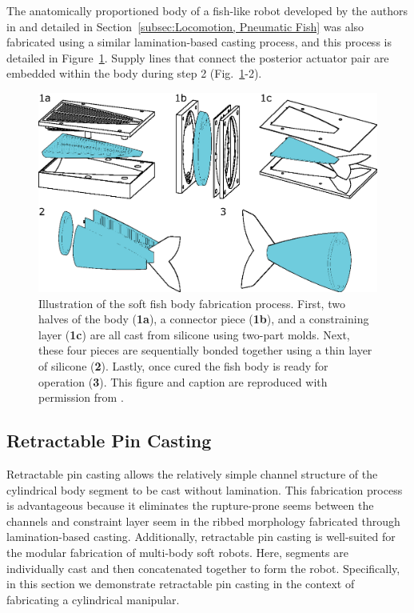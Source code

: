 The anatomically proportioned body of a fish-like robot developed by the authors in \citet{marchese2014autonomous} and detailed in Section~\ref{subsec:Locomotion, Pneumatic Fish} was also fabricated using a similar lamination-based casting process, and this process is detailed in Figure~\ref{fig:ribbed fab process_fish}.
Supply lines that connect the posterior actuator pair are embedded within the body during step 2 (Fig.~\ref{fig:ribbed fab process_fish}-2).
\begin{figure}[htb]
\includegraphics[width=\columnwidth]{figures/fabrication/fab_ribbed_process_fish.eps}
\caption{Illustration of the soft fish body fabrication process. First, two halves of the body (\textbf{1a}), a connector piece (\textbf{1b}), and a constraining layer (\textbf{1c}) are all cast from silicone using two-part molds. Next, these four pieces are sequentially bonded together using a thin layer of silicone (\textbf{2}). Lastly, once cured the fish body is ready for operation (\textbf{3}). This figure and caption are reproduced with permission from \citet{marchese2014autonomous}.}
\label{fig:ribbed fab process_fish}
\end{figure}

\subsection{Retractable Pin Casting}
\label{subsec:Fabrication, Retractable Pin Casting}
Retractable pin casting allows the relatively simple channel structure of the cylindrical body segment to be cast without lamination.
%
This fabrication process is advantageous because it eliminates the rupture-prone seems between the channels and constraint layer seem in the ribbed morphology fabricated through lamination-based casting.
%
Additionally, retractable pin casting is well-suited for the modular fabrication of multi-body soft robots.
%
Here, segments are individually cast and then concatenated together to form the robot.
%
Specifically, in this section we demonstrate retractable pin casting in the context of fabricating a cylindrical manipular.


